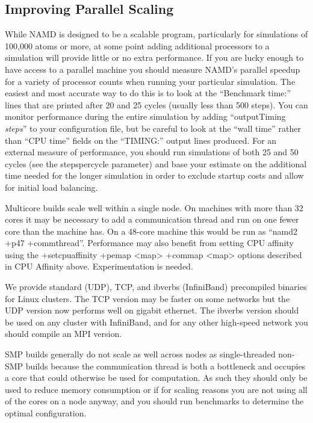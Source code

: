 \subsection{Improving Parallel Scaling}

While NAMD is designed to be a scalable program, particularly for
simulations of 100,000 atoms or more, at some point adding additional
processors to a simulation will provide little or no extra performance.
If you are lucky enough to have access to a parallel machine you should
measure NAMD's parallel speedup for a variety of processor counts when
running your particular simulation.  The easiest and most accurate way
to do this is to look at the ``Benchmark time:'' lines that are printed
after 20 and 25 cycles (usually less than 500 steps).  You can monitor
performance during the entire simulation by adding ``outputTiming {\em steps}''
to your configuration file, but be careful to look at the ``wall time''
rather than ``CPU time'' fields on the ``TIMING:'' output lines produced.
For an external measure of performance, you should run simulations of
both 25 and 50 cycles (see the stepspercycle parameter) and base your
estimate on the additional time needed for the longer simulation in
order to exclude startup costs and allow for initial load balancing.

Multicore builds scale well within a single node.  On machines with more
than 32 cores it may be necessary to add a communication thread and run
on one fewer core than the machine has.  On a 48-core machine this would
be run as ``namd2 +p47 +commthread''.  Performance may also benefit from
setting CPU affinity using the +setcpuaffinity +pemap <map> +commap <map>
options described in CPU Affinity above.  Experimentation is needed.

We provide standard (UDP), TCP, and ibverbs (InfiniBand) precompiled
binaries for Linux clusters.  The TCP version may be faster on some
networks but the UDP version now performs well on gigabit ethernet.
The ibverbs version should be used on any cluster with InfiniBand,
and for any other high-speed network you should compile an MPI version.

SMP builds generally do not scale as well across nodes as single-threaded
non-SMP builds because the communication thread is both a bottleneck and
occupies a core that could otherwise be used for computation.  As such
they should only be used to reduce memory consumption or if for scaling
reasons you are not using all of the cores on a node anyway, and you
should run benchmarks to determine the optimal configuration.

